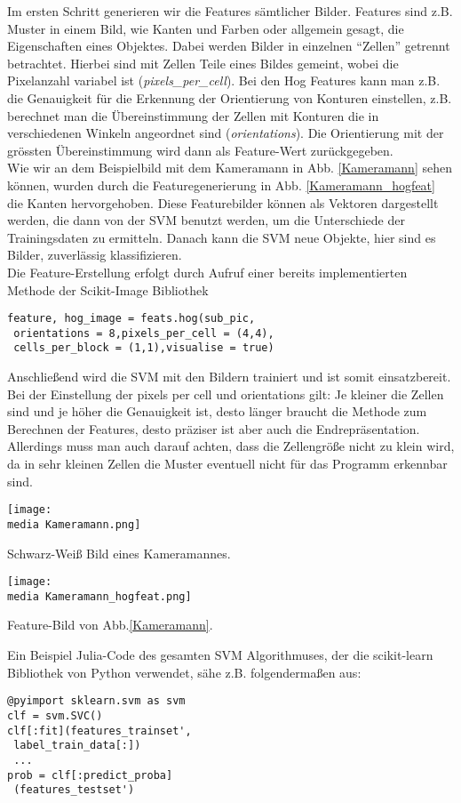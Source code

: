Im ersten Schritt generieren wir die Features sämtlicher Bilder. Features sind z.B. Muster in einem Bild, wie Kanten und Farben oder allgemein gesagt, die Eigenschaften eines Objektes. Dabei werden Bilder in einzelnen \enquote{Zellen} getrennt betrachtet. Hierbei sind mit Zellen Teile eines Bildes gemeint, wobei die Pixelanzahl variabel ist (\textit{pixels\_per\_cell}). Bei den Hog Features kann man z.B. die Genauigkeit f\"ur die Erkennung der Orientierung von Konturen einstellen, z.B. berechnet man die \"Ubereinstimmung der Zellen mit Konturen die in verschiedenen Winkeln angeordnet sind (\textit{orientations}). Die Orientierung mit der gr\"ossten \"Ubereinstimmung wird dann als Feature-Wert zur\"uckgegeben.\\
%
Wie wir an dem Beispielbild mit dem Kameramann in Abb. \ref{Kameramann} sehen können, wurden durch die Featuregenerierung in Abb. \ref{Kameramann_hogfeat} die Kanten hervorgehoben. Diese Featurebilder k\"onnen als Vektoren dargestellt werden, die dann von der SVM benutzt werden, um die Unterschiede der Trainingsdaten zu ermitteln. Danach kann die SVM neue Objekte, hier sind es Bilder, zuverl\"assig klassifizieren.\\ 
%
Die Feature-Erstellung erfolgt durch Aufruf einer bereits implementierten Methode der Scikit-Image Bibliothek
\begin{verbatim}
feature, hog_image = feats.hog(sub_pic,
 orientations = 8,pixels_per_cell = (4,4),
 cells_per_block = (1,1),visualise = true)
\end{verbatim}
Anschließend wird die SVM mit den Bildern trainiert und ist somit einsatzbereit.
Bei der Einstellung der pixels per cell und orientations gilt: Je kleiner die Zellen sind und je höher die Genauigkeit ist, desto länger braucht die Methode zum Berechnen der Features, desto pr\"aziser ist aber auch die Endrepr\"asentation. Allerdings muss man auch darauf achten, dass die Zellengröße nicht zu klein wird, da in sehr kleinen Zellen die Muster eventuell nicht für das Programm erkennbar sind. 

\begin{dsafigure}
\begin{center}
	\texttt{[image: \\media Kameramann.png]}
	\caption{Schwarz-Weiß Bild eines Kameramannes.}
	\label{Kameramann}
\end{center}
\end{dsafigure}

\begin{dsafigure}
\begin{center}
	\texttt{[image: \\media Kameramann\_hogfeat.png]}
	\caption{Feature-Bild von Abb.\ref{Kameramann}.}
	\label{Kameramann_hogfeat}
\end{center}
\end{dsafigure}

Ein Beispiel Julia-Code des gesamten SVM Algorithmuses, der die scikit-learn Bibliothek von Python verwendet, s\"ahe z.B. folgenderma\ss en aus: 
\begin{verbatim}
@pyimport sklearn.svm as svm
clf = svm.SVC()
clf[:fit](features_trainset', 
 label_train_data[:])
 ...
prob = clf[:predict_proba]
 (features_testset')
\end{verbatim}


